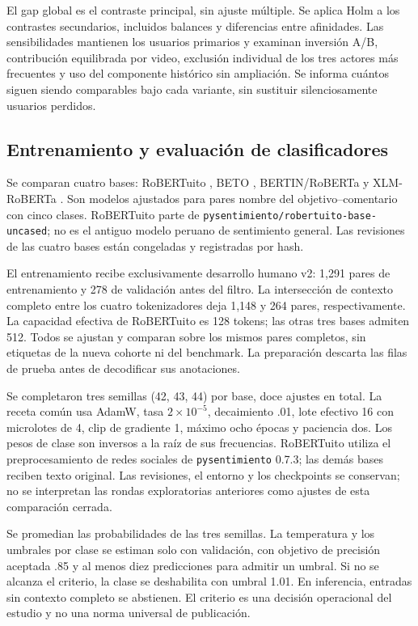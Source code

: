 \documentclass[conference,letterpaper]{IEEEtran}
\begin{document}
El gap global es el contraste principal, sin ajuste múltiple. Se aplica Holm a los contrastes secundarios, incluidos balances y diferencias entre afinidades. Las sensibilidades mantienen los usuarios primarios y examinan inversión A/B, contribución equilibrada por video, exclusión individual de los tres actores más frecuentes y uso del componente histórico sin ampliación. Se informa cuántos siguen siendo comparables bajo cada variante, sin sustituir silenciosamente usuarios perdidos.

\subsection{Entrenamiento y evaluación de clasificadores}
Se comparan cuatro bases: RoBERTuito \cite{robertuito}, BETO \cite{BETOResource}, BERTIN/RoBERTa \cite{BERTINResource} y XLM-RoBERTa \cite{XLMR2020}. Son modelos ajustados para pares nombre del objetivo--comentario con cinco clases. RoBERTuito parte de \texttt{pysentimiento/robertuito-base-uncased}; no es el antiguo modelo peruano de sentimiento general. Las revisiones de las cuatro bases están congeladas y registradas por hash.

El entrenamiento recibe exclusivamente desarrollo humano v2: 1,291 pares de entrenamiento y 278 de validación antes del filtro. La intersección de contexto completo entre los cuatro tokenizadores deja 1,148 y 264 pares, respectivamente. La capacidad efectiva de RoBERTuito es 128 tokens; las otras tres bases admiten 512. Todos se ajustan y comparan sobre los mismos pares completos, sin etiquetas de la nueva cohorte ni del benchmark. La preparación descarta las filas de prueba antes de decodificar sus anotaciones.

Se completaron tres semillas (42, 43, 44) por base, doce ajustes en total. La receta común usa AdamW, tasa $2\times10^{-5}$, decaimiento .01, lote efectivo 16 con microlotes de 4, clip de gradiente 1, máximo ocho épocas y paciencia dos. Los pesos de clase son inversos a la raíz de sus frecuencias. RoBERTuito utiliza el preprocesamiento de redes sociales de \texttt{pysentimiento} 0.7.3; las demás bases reciben texto original. Las revisiones, el entorno y los checkpoints se conservan; no se interpretan las rondas exploratorias anteriores como ajustes de esta comparación cerrada.

Se promedian las probabilidades de las tres semillas. La temperatura y los umbrales por clase se estiman solo con validación, con objetivo de precisión aceptada .85 y al menos diez predicciones para admitir un umbral. Si no se alcanza el criterio, la clase se deshabilita con umbral 1.01. En inferencia, entradas sin contexto completo se abstienen. El criterio es una decisión operacional del estudio y no una norma universal de publicación.
\end{document}

